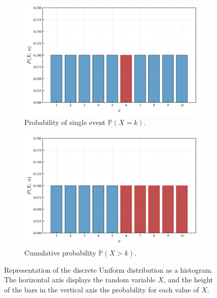 \documentclass{book}
\begin{document}
\begin{figure}[ht]
    \centering
    \begin{subfigure}[b]{0.48\textwidth}
        \centering
        \includegraphics[width=\textwidth, height=0.7\textwidth]{figures/chapter2/duniform_1.png}
        \caption{Probability of single event $\mathbb{P} (X = k)$.}
        \label{fig:uniform1}
    \end{subfigure}
    \hfill
    \begin{subfigure}[b]{0.48\textwidth}
        \centering
        \includegraphics[width=\textwidth, height=0.7\textwidth]{figures/chapter2/duniform_1_cum.png}
        \caption{Cumulative probability $\mathbb{P} (X > k)$.}
        \label{fig:uniform1_cum}
    \end{subfigure}
    \caption{Representation of the discrete Uniform distribution as a histogram. The horizontal axis displays the random variable $X$, and the height of the bars in the vertical axis the probability for each value of $X$.}
    \label{fig:uniform_comparison}
\end{figure}
\end{document}
